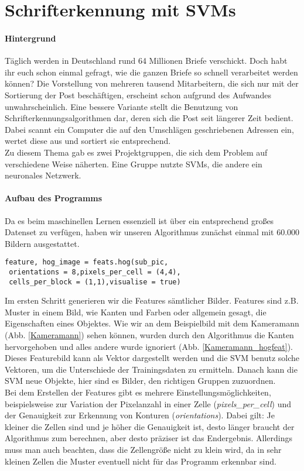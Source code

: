 \section{Schrifterkennung mit SVMs}
\paragraph{Hintergrund}
Täglich werden in Deutschland rund 64 Millionen Briefe verschickt. Doch habt ihr euch schon einmal gefragt, wie die ganzen Briefe so schnell verarbeitet werden können? Die Vorstellung von mehreren tausend Mitarbeitern, die sich nur mit der Sortierung der Post beschäftigen, erscheint schon aufgrund des Aufwandes unwahrscheinlich. Eine bessere Variante stellt die Benutzung von Schrifterkennungsalgorithmen dar, deren sich die Post seit längerer Zeit bedient. Dabei scannt ein Computer die auf den Umschlägen geschriebenen Adressen ein, wertet diese aus und sortiert sie entsprechend. \\
Zu diesem Thema gab es zwei Projektgruppen, die sich dem Problem auf verschiedene Weise näherten. Eine Gruppe nutzte SVMs, die andere ein neuronales Netzwerk.

\paragraph{Aufbau des Programms}

Da es beim maschinellen Lernen essenziell ist über ein entsprechend großes Datenset zu verfügen, haben wir unseren Algorithmus zunächst einmal mit 60.000 Bildern ausgestattet. 

\begin{verbatim}
feature, hog_image = feats.hog(sub_pic,
 orientations = 8,pixels_per_cell = (4,4),
 cells_per_block = (1,1),visualise = true)
\end{verbatim}

Im ersten Schritt generieren wir die Features sämtlicher Bilder. Features sind z.B. Muster in einem Bild, wie Kanten und Farben oder allgemein gesagt, die Eigenschaften eines Objektes. Wie wir an dem Beispielbild mit dem Kameramann (Abb. \ref{Kameramann}) sehen können, wurden durch den Algorithmus die Kanten hervorgehoben und alles andere wurde ignoriert (Abb. \ref{Kameramann_hogfeat}). Dieses Featurebild kann als Vektor dargestellt werden und die SVM benutz solche Vektoren, um die Unterschiede der Trainingsdaten zu ermitteln. Danach kann die SVM neue Objekte, hier sind es Bilder, den richtigen Gruppen zuzuordnen.\\ 
Bei dem Erstellen der Features gibt es mehrere Einstellungsmöglichkeiten, beispielsweise zur Variation der Pixelanzahl in einer Zelle (\textit{pixels\_per\_cell}) und der Genauigkeit zur Erkennung von Konturen (\textit{orientations}). Dabei gilt: Je kleiner die Zellen sind und je höher die Genauigkeit ist, desto länger braucht der Algorithmus zum berechnen, aber desto präziser ist das Endergebnis. Allerdings muss man auch beachten, dass die Zellengröße nicht zu klein wird, da in sehr kleinen Zellen die Muster eventuell nicht für das Programm erkennbar sind. 


